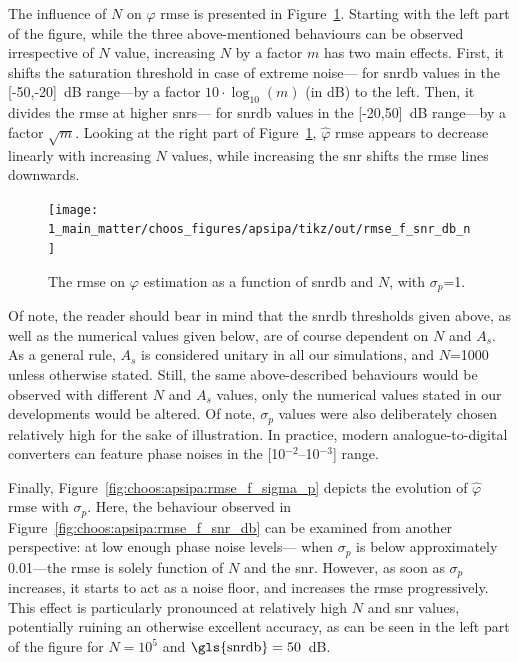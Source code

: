 The influence of $N$ on $\widehat{\varphi}$ \gls{rmse} is presented in Figure~\ref{fig:choos:apsipa:rmse_f_snr_db_n}. Starting with the left part of the figure, while the three above-mentioned behaviours can be observed irrespective of $N$ value, increasing $N$ by a factor $m$ has two main effects. First, it shifts the saturation threshold in case of extreme noise---\ie{} for \gls{snrdb} values in the [-50,-20]~dB range---by a factor $10\cdot \log_{10}(m)$ (in dB) to the left. Then, it divides the \gls{rmse} at higher \glspl{snr}---\ie{} for \gls{snrdb} values in the [-20,50]~dB range---by a factor $\sqrt{m}$. Looking at the right part of Figure~\ref{fig:choos:apsipa:rmse_f_snr_db_n}, $\widehat{\varphi}$ \gls{rmse} appears to decrease linearly with increasing $N$ values, while increasing the \gls{snr} shifts the \gls{rmse} lines downwards.

\begin{figure}
	\centering
	\texttt{[image: 1\_main\_matter/choos\_figures/apsipa/tikz/out/rmse\_f\_snr\_db\_n]}
	\caption{The \gls{rmse} on $\varphi$ estimation as a function of \gls{snrdb} and $N$, with $\sigma_p$=1{\degree}.}
	\label{fig:choos:apsipa:rmse_f_snr_db_n}
\end{figure}

Of note, the reader should bear in mind that the \gls{snrdb} thresholds given above, as well as the numerical values given below, are of course dependent on $N$ and $A_s$. As a general rule, $A_s$ is considered unitary in all our simulations, and $N$=1000 unless otherwise stated. Still, the same above-described behaviours would be observed with different $N$ and $A_s$ values, only the numerical values stated in our developments would be altered. Of note, $\sigma_p$ values were also deliberately chosen relatively high for the sake of illustration. In practice, modern analogue-to-digital converters can feature phase noises in the [10$^{-2}$--10$^{-3}$]{\degree} range\cite{ad_phase_noise, calosso2019}.

Finally, Figure~\ref{fig:choos:apsipa:rmse_f_sigma_p} depicts the evolution of $\widehat{\varphi}$ \gls{rmse} with $\sigma_p$. Here, the behaviour observed in Figure~\ref{fig:choos:apsipa:rmse_f_snr_db} can be examined from another perspective: at low enough phase noise levels---\ie{} when $\sigma_p$ is below approximately 0.01{\degree}---the \gls{rmse} is solely function of $N$ and the \gls{snr}. However, as soon as $\sigma_p$ increases, it starts to act as a noise floor, and increases the \gls{rmse} progressively. This effect is particularly pronounced at relatively high $N$ and \gls{snr} values, potentially ruining an otherwise excellent accuracy, as can be seen in the left part of the figure for $N=10^5$ and $\text{\gls{snrdb}}=50$~dB.

